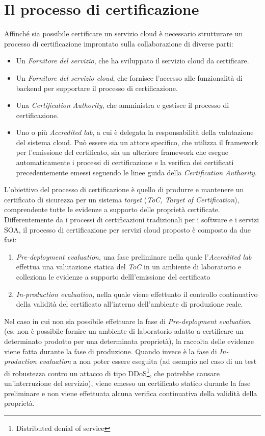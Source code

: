\documentclass[../main.tex]{subfiles}
\begin{document}
\section{Il processo di certificazione}

Affinché sia possibile certificare un servizio cloud è necessario strutturare un processo di certificazione improntato sulla collaborazione di diverse parti\cite{Cloud1}:
\begin{itemize}
\item Un \textit{Fornitore del servizio}, che ha sviluppato il servizio cloud da certificare.
\item Un \textit{Fornitore del servizio cloud}, che fornisce l'accesso alle funzionalità di backend per supportare il processo di certificazione.
\item Una \textit{Certification Authority}, che amministra e gestisce il processo di certificazione.
\item Uno o più \textit{Accredited lab}, a cui è delegata la responsabilità della valutazione del sistema cloud. Può essere sia un attore specifico, che utilizza il framework per l'emissione del certificato, sia un ulteriore framework che esegue automaticamente i processi di certificazione e la verifica dei certificati precedentemente emessi seguendo le linee guida della \textit{Certification Authority}.
\end{itemize}

L'obiettivo del processo di certificazione è quello di produrre e mantenere un certificato  di sicurezza per un sistema \textit{target} (\textit{ToC, Target of Certification}), comprendente tutte le evidenze a supporto delle proprietà certificate.\cite{Cloud1}
Differentemente da i processi di certificazioni tradizionali per i software e i servizi SOA, il processo di certificazione per servizi cloud proposto è composto da due fasi:
\begin{enumerate}
\item \textit{Pre-deployment evaluation}, una fase preliminare nella quale l'\textit{Accredited lab} effettua una valutazione statica del \textit{ToC} in un ambiente di laboratorio e colleziona le evidenze a supporto delll'emissione del certificato
\item \textit{In-production evaluation}, nella quale viene effettuato il controllo continuativo della validità del certificato all'interno dell'ambiente di produzione reale.
\end{enumerate}

Nel caso in cui non sia possibile effettuare la fase di \textit{Pre-deployment evaluation} (es. non è possibile fornire un ambiente di laboratorio adatto a certificare un determinato prodotto per una determinata proprietà), la raccolta delle evidenze viene fatta durante la fase di produzione.
Quando invece è la fase di \textit{In-production evaluation} a non poter essere eseguita (ad esempio nel caso di un test di robustezza contro un attacco di tipo DDoS\footnote{Distributed denial of service}, che potrebbe causare un'interruzione del servizio), viene emesso un certificato statico durante la fase preliminare e non viene effettuata alcuna verifica continuativa della validità della proprietà.\cite{Cloud1}
\end{document}
